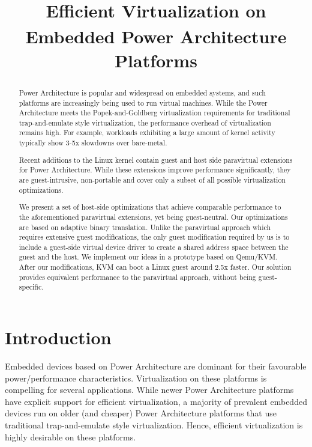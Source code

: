\documentclass[10pt,twocolumn]{article}
\begin{document}
\title{Efficient Virtualization on Embedded Power Architecture\textsuperscript{\textregistered} Platforms}
\author{}
\date{}
\maketitle
\thispagestyle{empty}

\maketitle
\begin{abstract}
  Power Architecture\textsuperscript{\textregistered} is popular and widespread on embedded systems, and such
  platforms are
  increasingly
  being used to run virtual machines\cite{embedded_virtualization}. While the Power
  Architecture meets the
  Popek-and-Goldberg virtualization requirements for traditional trap-and-emulate
  style virtualization, the performance overhead of virtualization remains high.
  For example, workloads exhibiting a large amount of kernel activity typically
  show 3-5x slowdowns over bare-metal.

  Recent additions to the Linux kernel contain guest and host side paravirtual
  extensions for Power Architecture. While these extensions improve performance
  significantly, they
  are guest-intrusive, non-portable and cover only a subset of all possible
  virtualization optimizations.

  We present a set of host-side optimizations that achieve comparable
  performance
  to the aforementioned paravirtual extensions, yet being
  guest-neutral. Our optimizations are based on adaptive binary translation.
  Unlike the paravirtual approach which requires extensive
  guest modifications, the only
  guest modification required by us is to include a guest-side virtual device driver
  to create a shared address space between the guest and the host.
  We implement our ideas in a prototype based on Qemu/KVM.
  After our modifications, KVM can boot a Linux guest around 2.5x faster. Our solution
  provides equivalent performance to
  the paravirtual approach, without being guest-specific.
\end{abstract}
\section{Introduction}
Embedded devices based on Power Architecture are dominant for their
favourable power/performance characteristics. Virtualization on these platforms is
compelling for several applications\cite{embedded_virtualization}. While newer Power
Architecture platforms
have explicit support for efficient virtualization\cite{freescale_embedded_hyperv, hwassists_hyperv}, a majority of
prevalent embedded devices run on older (and cheaper) Power Architecture platforms that use
traditional trap-and-emulate style virtualization\cite{popekgoldberg}. Hence, efficient
virtualization is highly desirable on these platforms.
\end{document}
